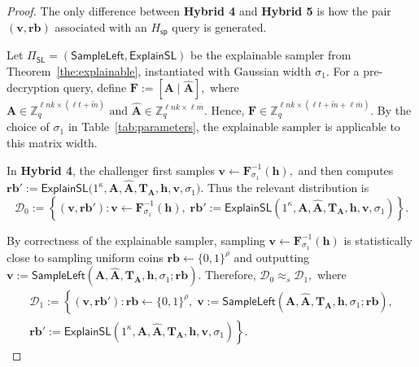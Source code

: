 \noindent\begin{proof}
The only difference between \textbf{Hybrid 4} and \textbf{Hybrid 5} is how
the pair $(\mathbf v,\mathbf{rb})$ associated with an
$H_{\mathsf{sp}}$ query is generated.

Let
$
    \Pi_{\mathsf{SL}}
    =
    (\mathsf{SampleLeft},\mathsf{ExplainSL})
$
be the explainable sampler from Theorem~\ref{the:explainable}, instantiated
with Gaussian width $\sigma_1$. For a pre-decryption query, define
$
    \mathbf F := [\mathbf A\mid \widehat{\mathbf A}],
$
where
$
    \mathbf A\in
    \mathbb Z_q^{\ell nk\times(\ell t+\widetilde m)}
   \text{ and }
    \widehat{\mathbf A}\in
    \mathbb Z_q^{\ell nk\times \ell\overline m}.
$
Hence,
$
    \mathbf F
    \in
    \mathbb Z_q^{
        \ell nk\times(\ell t+\widetilde m+\ell\overline m)
    }.
$
By the choice of $\sigma_1$ in Table~\ref{tab:parameters}, the explainable
sampler is applicable to this matrix width.

In \textbf{Hybrid 4}, the challenger first samples
$
    \mathbf v
    \leftarrow
    \mathbf F^{-1}_{\sigma_1}(\mathbf h),
$
and then computes
$
    \mathbf{rb}'
    :=
    \mathsf{ExplainSL}
    \bigl(
        1^\kappa,
        \mathbf A,
        \widehat{\mathbf A},
        \mathbf T_{\mathbf A},
        \mathbf h,
        \mathbf v,
        \sigma_1
    \bigr).
$
Thus the relevant distribution is
\[
    \mathcal D_0
    :=
    \left\{
        (\mathbf v,\mathbf{rb}') :
        \mathbf v\leftarrow \mathbf F^{-1}_{\sigma_1}(\mathbf h),
        \;
        \mathbf{rb}'
        :=
        \mathsf{ExplainSL}
        (1^\kappa,\mathbf A,\widehat{\mathbf A},
        \mathbf T_{\mathbf A},\mathbf h,\mathbf v,\sigma_1)
    \right\}.
\]

By correctness of the explainable sampler, sampling
$
    \mathbf v
    \leftarrow
    \mathbf F^{-1}_{\sigma_1}(\mathbf h)
$
is statistically close to sampling uniform coins
$\mathbf{rb}\leftarrow\{0,1\}^{\rho}$ and outputting
$
    \mathbf v
    :=
    \mathsf{SampleLeft}
    (
        \mathbf A,
        \widehat{\mathbf A},
        \mathbf T_{\mathbf A},
        \mathbf h,
        \sigma_1;
        \mathbf{rb}
    ).
$
Therefore,
$
    \mathcal D_0 \approx_s \mathcal D_1,
$
where
\[
\begin{aligned}
    \mathcal D_1
    :=
    \left\{
        (\mathbf v,\mathbf{rb}') :
        \mathbf{rb}\leftarrow\{0,1\}^{\rho},
        \;
        \mathbf v :=
        \mathsf{SampleLeft}
        (
            \mathbf A,
            \widehat{\mathbf A},
            \mathbf T_{\mathbf A},
            \mathbf h,
            \sigma_1;
            \mathbf{rb}
        ),
        \right.\\
        \left.
        \mathbf{rb}'
        :=
        \mathsf{ExplainSL}
        (
            1^\kappa,
            \mathbf A,
            \widehat{\mathbf A},
            \mathbf T_{\mathbf A},
            \mathbf h,
            \mathbf v,
            \sigma_1
        )
    \right\}.
\end{aligned}
\]


\end{proof}
